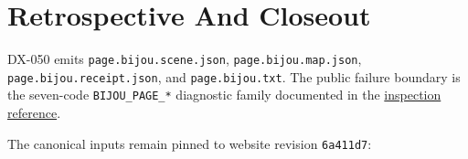 \section{Retrospective And Closeout}\label{record-146-retrospective-and-closeout}

DX-050 emits \texttt{p\allowbreak{}a\allowbreak{}g\allowbreak{}e\allowbreak{}.\allowbreak{}b\allowbreak{}i\allowbreak{}j\allowbreak{}o\allowbreak{}u\allowbreak{}.\allowbreak{}s\allowbreak{}c\allowbreak{}e\allowbreak{}n\allowbreak{}e\allowbreak{}.\allowbreak{}j\allowbreak{}s\allowbreak{}o\allowbreak{}n}, \texttt{p\allowbreak{}a\allowbreak{}g\allowbreak{}e\allowbreak{}.\allowbreak{}b\allowbreak{}i\allowbreak{}j\allowbreak{}o\allowbreak{}u\allowbreak{}.\allowbreak{}m\allowbreak{}a\allowbreak{}p\allowbreak{}.\allowbreak{}j\allowbreak{}s\allowbreak{}o\allowbreak{}n}, \texttt{p\allowbreak{}a\allowbreak{}g\allowbreak{}e\allowbreak{}.\allowbreak{}b\allowbreak{}i\allowbreak{}j\allowbreak{}o\allowbreak{}u\allowbreak{}.\allowbreak{}r\allowbreak{}e\allowbreak{}c\allowbreak{}e\allowbreak{}i\allowbreak{}p\allowbreak{}t\allowbreak{}.\allowbreak{}j\allowbreak{}s\allowbreak{}o\allowbreak{}n}, and \texttt{p\allowbreak{}a\allowbreak{}g\allowbreak{}e\allowbreak{}.\allowbreak{}b\allowbreak{}i\allowbreak{}j\allowbreak{}o\allowbreak{}u\allowbreak{}.\allowbreak{}t\allowbreak{}x\allowbreak{}t}. The public failure boundary is the seven-code \texttt{B\allowbreak{}I\allowbreak{}J\allowbreak{}O\allowbreak{}U\allowbreak{}\_\allowbreak{}P\allowbreak{}A\allowbreak{}G\allowbreak{}E\allowbreak{}\_\allowbreak{}*} diagnostic family documented in the \href{https://github.com/flyingrobots/bijou/blob/cbd70612140e7a450d764b3c7be1c6af878b99bc/docs/reference/profunctor-page-inspection.md\#diagnostics}{inspection reference}.

The canonical inputs remain pinned to website revision \texttt{6\allowbreak{}a\allowbreak{}4\allowbreak{}1\allowbreak{}1\allowbreak{}d\allowbreak{}7}:

